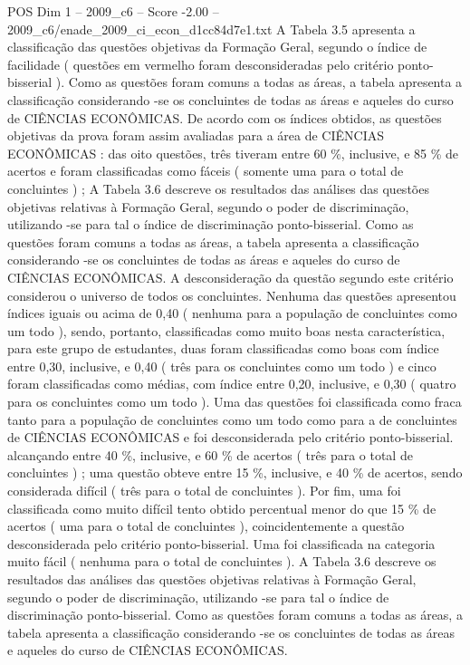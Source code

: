 \begin{textsample}{POS Dim 1 – 2009\_c6 – Score -2.00 – 2009\_c6/enade\_2009\_ci\_econ\_d1cc84d7e1.txt}
A Tabela 3.5 apresenta a classificação das questões objetivas da Formação Geral, segundo o índice de facilidade ( questões em vermelho foram desconsideradas pelo critério ponto-bisserial ).
Como as questões foram comuns a todas as áreas, a tabela apresenta a classificação considerando -se os concluintes de todas as áreas e aqueles do curso de CIÊNCIAS ECONÔMICAS.
De acordo com os índices obtidos, as questões objetivas da prova foram assim avaliadas para a área de CIÊNCIAS ECONÔMICAS : das oito questões, três tiveram entre 60 \%, inclusive, e 85 \% de acertos e foram classificadas como fáceis ( somente uma para o total de concluintes ) ; A Tabela 3.6 descreve os resultados das análises das questões objetivas relativas à Formação Geral, segundo o poder de discriminação, utilizando -se para tal o índice de discriminação ponto-bisserial.
Como as questões foram comuns a todas as áreas, a tabela apresenta a classificação considerando -se os concluintes de todas as áreas e aqueles do curso de CIÊNCIAS ECONÔMICAS.
A desconsideração da questão segundo este critério considerou o universo de todos os concluintes.
Nenhuma das questões apresentou índices iguais ou acima de 0,40 ( nenhuma para a população de concluintes como um todo ), sendo, portanto, classificadas como muito boas nesta característica, para este grupo de estudantes, duas foram classificadas como boas com índice entre 0,30, inclusive, e 0,40 ( três para os concluintes como um todo ) e cinco foram classificadas como médias, com índice entre 0,20, inclusive, e 0,30 ( quatro para os concluintes como um todo ).
Uma das questões foi classificada como fraca tanto para a população de concluintes como um todo como para a de concluintes de CIÊNCIAS ECONÔMICAS e foi desconsiderada pelo critério ponto-bisserial. alcançando entre 40 \%, inclusive, e 60 \% de acertos ( três para o total de concluintes ) ; uma questão obteve entre 15 \%, inclusive, e 40 \% de acertos, sendo considerada difícil ( três para o total de concluintes ).
Por fim, uma foi classificada como muito difícil tento obtido percentual menor do que 15 \% de acertos ( uma para o total de concluintes ), coincidentemente a questão desconsiderada pelo critério ponto-bisserial.
Uma foi classificada na categoria muito fácil ( nenhuma para o total de concluintes ).
A Tabela 3.6 descreve os resultados das análises das questões objetivas relativas à Formação Geral, segundo o poder de discriminação, utilizando -se para tal o índice de discriminação ponto-bisserial.
Como as questões foram comuns a todas as áreas, a tabela apresenta a classificação considerando -se os concluintes de todas as áreas e aqueles do curso de CIÊNCIAS ECONÔMICAS.

\end{textsample}
